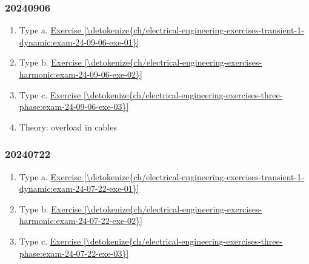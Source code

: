 \documentclass[letterpaper,10pt,english]{jupyterBook}
\begin{document}
\subsubsection*{2024\sphinxhyphen{}09\sphinxhyphen{}06}
\begin{enumerate}
%
\item {} 
\sphinxAtStartPar
Type a. \hyperref[\detokenize{ch/electrical-engineering-exercises-transient-1-dynamic:exam-24-09-06-exe-01}]{Exercise \ref{\detokenize{ch/electrical-engineering-exercises-transient-1-dynamic:exam-24-09-06-exe-01}}}

\item {} 
\sphinxAtStartPar
Type b. \hyperref[\detokenize{ch/electrical-engineering-exercises-harmonic:exam-24-09-06-exe-02}]{Exercise \ref{\detokenize{ch/electrical-engineering-exercises-harmonic:exam-24-09-06-exe-02}}}

\item {} 
\sphinxAtStartPar
Type c. \hyperref[\detokenize{ch/electrical-engineering-exercises-three-phase:exam-24-09-06-exe-03}]{Exercise \ref{\detokenize{ch/electrical-engineering-exercises-three-phase:exam-24-09-06-exe-03}}}

\item {} 
\sphinxAtStartPar
Theory: overload in cables

\end{enumerate}
\subsubsection*{2024\sphinxhyphen{}07\sphinxhyphen{}22}
\begin{enumerate}
%
\item {} 
\sphinxAtStartPar
Type a. \hyperref[\detokenize{ch/electrical-engineering-exercises-transient-1-dynamic:exam-24-07-22-exe-01}]{Exercise \ref{\detokenize{ch/electrical-engineering-exercises-transient-1-dynamic:exam-24-07-22-exe-01}}}

\item {} 
\sphinxAtStartPar
Type b. \hyperref[\detokenize{ch/electrical-engineering-exercises-harmonic:exam-24-07-22-exe-02}]{Exercise \ref{\detokenize{ch/electrical-engineering-exercises-harmonic:exam-24-07-22-exe-02}}}

\item {} 
\sphinxAtStartPar
Type c. \hyperref[\detokenize{ch/electrical-engineering-exercises-three-phase:exam-24-07-22-exe-03}]{Exercise \ref{\detokenize{ch/electrical-engineering-exercises-three-phase:exam-24-07-22-exe-03}}}

\end{enumerate}
\end{document}
